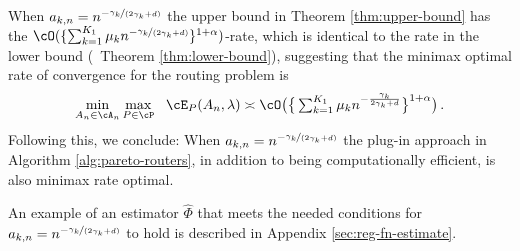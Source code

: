 \begin{remark} \label{cor:efficient-routers}
    When $a_{k, n} = n^{-\nicefrac{\gamma_k}{(2\gamma_k +d)}}$ the upper bound in Theorem \ref{thm:upper-bound} has the $\cO(\{\sum_{k = 1}^{K_1}\mu_k n^{-\nicefrac{\gamma_k}{(2\gamma_k+d)}}\}^{1+\alpha})$-rate, which is identical to the rate in the lower bound (\cf\ Theorem \ref{thm:lower-bound}), suggesting that the minimax optimal rate of convergence for the routing problem is 
\begin{equation}
    \label{eq:minimax-rate}
     \textstyle  \min\limits_{A_n \in \cA_n} \max\limits_{P \in \cP} ~~ \cE_P(A_n, \lambda) \asymp \textstyle  \cO\big ( \big \{\sum_{k = 1}^{K_1} \mu_k n^{- \frac{\gamma_k}{2\gamma_k + d}}\big\}^{1+\alpha}\big ) \,.
\end{equation}
   Following this, we conclude: When $a_{k, n} = n^{-\nicefrac{\gamma_k}{(2\gamma_k +d)}}$ the plug-in approach in Algorithm \ref{alg:pareto-routers}, in addition to being computationally efficient, is also minimax rate optimal. 
\end{remark} 
An example of an estimator $\widehat{\Phi}$ that meets the needed conditions for $a_{k, n} = n^{-\nicefrac{\gamma_k}{(2\gamma_k +d)}}$ to hold is described in Appendix \ref{sec:reg-fn-estimate}. 
    
